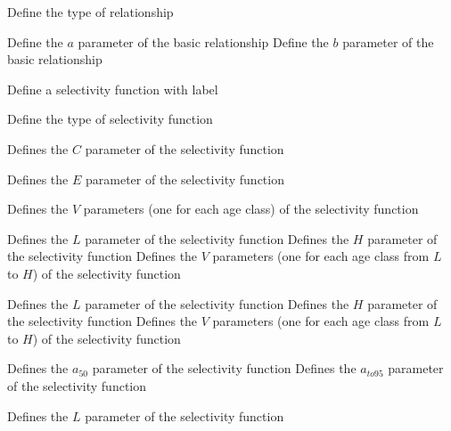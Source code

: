  {Define the type of relationship}
\par\textbf{}\par
\par\textbf{}\par
{} {Define the $a$ parameter of the basic relationship}
 {Define the $b$ parameter of the basic relationship}
\par {} {Define a selectivity function with label}\par
{} {Define the type of selectivity function}
\par\textbf{}\par
{} {Defines the $C$ parameter of the selectivity function}
\par\textbf{}\par
{} {Defines the $E$ parameter of the selectivity function}
\par\textbf{}\par
{} {Defines the $V$ parameters (one for each age class) of the selectivity function}
\par\textbf{}\par
{} {Defines the $L$ parameter of the selectivity function}
 {Defines the $H$ parameter of the selectivity function}
 {Defines the $V$ parameters (one for each age class from $L$ to $H$) of the selectivity function}
\par\textbf{}\par
{} {Defines the $L$ parameter of the selectivity function}
 {Defines the $H$ parameter of the selectivity function}
 {Defines the $V$ parameters (one for each age class from $L$ to $H$) of the selectivity function}
\par\textbf{}\par
{} {Defines the $a_{50}$ parameter of the selectivity function}
 {Defines the $a_{to95}$ parameter of the selectivity function}
\par\textbf{}\par
{} {Defines the $L$ parameter of the selectivity function}
